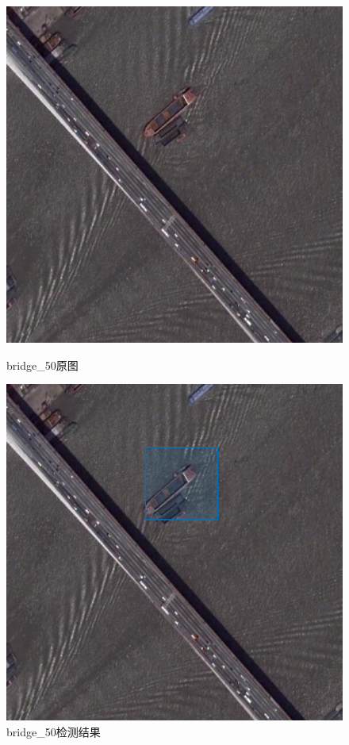 \begin{figure}[H]
	\centering
	\begin{minipage}{0.45\linewidth}
		\includegraphics[width=\linewidth]{figure/bridge_50.jpg}
		\caption{bridge\_50原图}
	\end{minipage}
	\begin{minipage}{0.45\linewidth}
		\includegraphics[width=\linewidth]{figure/bridge_50_marked_ship.png}
		\caption{bridge\_50检测结果}
	\end{minipage}
\end{figure}
